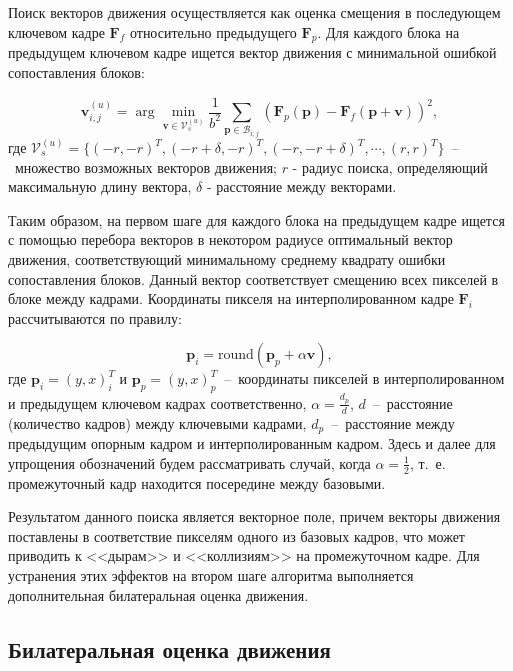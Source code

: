 Поиск векторов движения осуществляется как оценка смещения в последующем ключевом кадре $\mathbf{F}_f$ относительно предыдущего $\mathbf{F}_p$. Для каждого блока на предыдущем ключевом кадре ищется вектор движения с минимальной ошибкой сопоставления блоков:

\begin{equation*}
\mathbf{v}_{i,j}^{(u)} = \arg\min_{\mathbf{v} \in \mathcal{V}_{s}^{(u)}} \frac{1}{b^2} \sum\limits_{\mathbf{p} \in \mathcal{B}_{i,j}} (\mathbf{F}_p(\mathbf{p}) - \mathbf{F}_f(\mathbf{p}+\mathbf{v}))^2,
\end{equation*}
где $\mathcal{V}_{s}^{(u)}=\{ (-r,-r)^T, (-r+\delta,-r)^T, (-r,-r+\delta)^T, \cdots, (r,r)^T \}$~--~множество возможных векторов движения; $r$ - радиус поиска, определяющий максимальную длину вектора, $\delta$ - расстояние между векторами.

Таким образом, на первом шаге для каждого блока на предыдущем кадре ищется с помощью перебора векторов в некотором радиусе оптимальный вектор движения, соответствующий минимальному среднему квадрату ошибки сопоставления блоков. Данный вектор соответствует смещению всех пикселей в блоке между кадрами. Координаты пикселя на интерполированном кадре $\mathbf{F}_i$ рассчитываются по правилу:

\begin{equation*}
\mathbf{p}_i = \mathrm{round}(\mathbf{p}_p + \alpha\mathbf{v}),
\end{equation*}
где $\mathbf{p}_i=(y,x)_i^T$ и $\mathbf{p}_p=(y,x)_p^T$~--~координаты пикселей в интерполированном и предыдущем ключевом кадрах соответственно, $\alpha=\frac{d_p}{d}$, $d$~--~расстояние (количество кадров) между ключевыми кадрами, $d_p$~--~расстояние между предыдущим опорным кадром и интерполированным кадром. Здесь и далее для упрощения обозначений будем рассматривать случай, когда $\alpha=\frac{1}{2}$, т.~е. промежуточный кадр находится посередине между базовыми.

Результатом данного поиска является векторное поле, причем векторы движения поставлены в соответствие пикселям одного из базовых кадров, что может приводить к <<дырам>> и <<коллизиям>> на промежуточном кадре. Для устранения этих эффектов на втором шаге алгоритма выполняется дополнительная билатеральная оценка движения.

\subsection{Билатеральная оценка движения}

